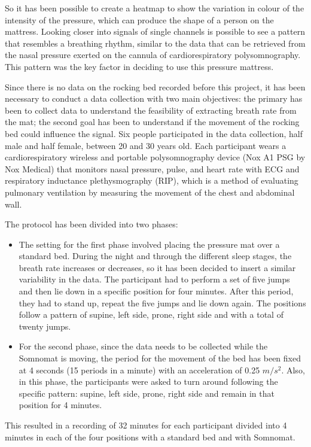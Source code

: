 So it has been possible to create a heatmap to show the variation in colour of the intensity of the pressure, which can produce the shape of a person on the mattress.
Looking closer into signals of single channels is possible to see a pattern that resembles a breathing rhythm, similar to the data that can be retrieved from the nasal pressure exerted on the cannula of cardiorespiratory polysomnography.
This pattern was the key factor in deciding to use this pressure mattress. 


Since there is no data on the rocking bed recorded before this project, it has been necessary to conduct a data collection with two main objectives: the primary has been to collect data to understand the feasibility of extracting breath rate from the mat; the second goal has been to understand if the movement of the rocking bed could influence the signal.
Six people participated in the data collection, half male and half female, between 20 and 30 years old.
Each participant wears a cardiorespiratory wireless and portable polysomnography device (Nox A1 PSG by Nox Medical\cite{WirelessSystem}) that monitors nasal pressure, pulse, and heart rate with ECG and respiratory inductance plethysmography (RIP), which is a method of evaluating pulmonary ventilation by measuring the movement of the chest and abdominal wall. 

The protocol has been divided into two phases:
\begin{itemize}
\item The setting for the first phase involved placing the pressure mat over a standard bed. During the night and through the different sleep stages, the breath rate increases or decreases, so it has been decided to insert a similar variability in the data. The participant had to perform a set of five jumps and then lie down in a specific position for four minutes. After this period, they had to stand up, repeat the five jumps and lie down again. The positions follow a pattern of supine, left side, prone, right side and with a total of twenty jumps.


\item For the second phase, since the data needs to be collected while the Somnomat is moving, the period for the movement of the bed has been fixed at 4 seconds (15 periods in a minute) with an acceleration of 0.25 $m/s^2$. Also, in this phase, the participants were asked to turn around following the specific pattern: supine, left side, prone, right side and remain in that position for 4 minutes.
\end{itemize}
This resulted in a recording of 32 minutes for each participant divided into 4 minutes in each of the four positions with a standard bed and with Somnomat.


